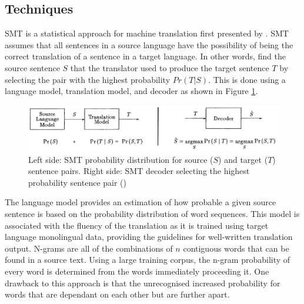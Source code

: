 \subsection{Techniques}


\acrfull{SMT} is a statistical approach for machine translation first presented by \cite{brown_statistical_1990}. 
\acrshort{SMT} assumes that all sentences in a source language have the possibility of being the correct translation of a sentence in a target language. 
In other words, find the source sentence $S$ that the translator used to produce the target sentence $T$ by selecting the pair with the highest probability $Pr ( T | S )$.
This is done using a language model, translation model, and decoder as shown in Figure \ref{fig:smt_diagram}.

\begin{figure}[ht!]
\centering
\includegraphics[width=1\textwidth]{media/literature/machine_translation/smt_3.png}
\caption[\acrshort{SMT} probability distribution and decoder]{Left side: \acrshort{SMT} probability distribution for source ($S$) and target ($T$) sentence pairs. Right side: \acrshort{SMT} decoder selecting the highest probability sentence pair (\cite{brown_statistical_1990})}
\label{fig:smt_diagram}
\end{figure}

The language model provides an estimation of how probable a given source sentence is based on the probability distribution of word sequences. This model is associated with the fluency of the translation as it is trained using target language monolingual data, providing the guidelines for well-written translation output. N-grams are all of the combinations of $n$ contiguous words that can be found in a source text. Using a large training corpus, the n-gram probability of every word is determined from the words immediately proceeding it. One drawback to this approach is that the unrecognised increased probability for words that are dependant on each other but are further apart.

